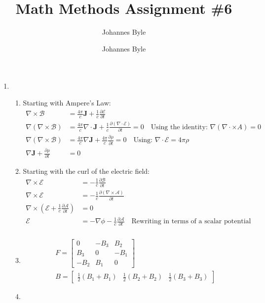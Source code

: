 \documentclass[12pt]{article}
\title{}
\author{Johannes Byle}
\title{Math Methods Assignment \#6}
\author{Johannes Byle}
\newcommand{\p}[2]{\frac{\partial #1}{\partial #2}}
\newcommand{\curl}{\nabla\times}
\begin{document}
    \maketitle
    \begin{enumerate}
        \item
        \begin{enumerate}
            \item Starting with Ampere's Law:
            \begin{align*}
                \nabla\times\mathcal{B}&=\frac{4\pi}{c}\pmb{J}+\frac{1}{c}\p{\mathcal{E}}{t}\\
                \nabla\left(\nabla\times\mathcal{B}\right)&=\frac{4\pi}{c}\nabla\cdot\pmb{J}+\frac{1}{c}\p{(\nabla\cdot\mathcal{E})}{t}=0\quad\text{Using the identity: }\nabla\left( \nabla\cdot\times A \right)=0\\
                \nabla\left(\nabla\times\mathcal{B}\right)&=\frac{4\pi}{c}\nabla\pmb{J}+\frac{4\pi}{c}\p{\rho}{t}=0\quad\text{Using: }\nabla\cdot\mathcal{E}=4\pi\rho\\
                \nabla\pmb{J}+\p{\rho}{t}&=0
            \end{align*}
            \item Starting with the curl of the electric field:
            \begin{align*}
                \curl\mathcal{E}&=-\frac{1}{c}\p{\mathcal{B}}{t}\\
                \curl\mathcal{E}&=-\frac{1}{c}\p{(\curl\mathcal{A})}{t}\\
                \curl\left(\mathcal{E}+\frac{1}{c}\p{\mathcal{A}}{t}\right)&=0\\
                \mathcal{E}&=-\nabla\phi-\frac{1}{c}\p{\mathcal{A}}{t}\quad\text{Rewriting in terms of a scalar potential}\\
            \end{align*}
            \item
            \begin{gather*}
                F=
                \begin{bmatrix}
                    0    & -B_3 & B_2  \\
                    B_3  & 0    & -B_1 \\
                    -B_2 & B_1  & 0
                \end{bmatrix}\\
                B=
                \begin{bmatrix}
                    \frac{1}{2}(B_1+B_1) & \frac{1}{2}(B_2+B_2)& \frac{1}{2}(B_3+B_3)
                \end{bmatrix}
            \end{gather*}
            \item
        \end{enumerate}
    \end{enumerate}
\end{document}
